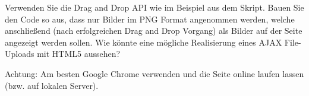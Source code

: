 %
\par Verwenden Sie die Drag and Drop API wie im Beispiel aus dem Skript. Bauen Sie den Code so aus, dass nur Bilder im PNG Format angenommen werden, welche anschließend (nach erfolgreichen Drag and Drop Vorgang) als Bilder auf der Seite angezeigt werden sollen. Wie könnte eine mögliche Realisierung eines AJAX File-Uploads mit HTML5 aussehen?
%
\par Achtung: Am besten Google Chrome verwenden und die Seite online laufen lassen (bzw. auf lokalen Server).